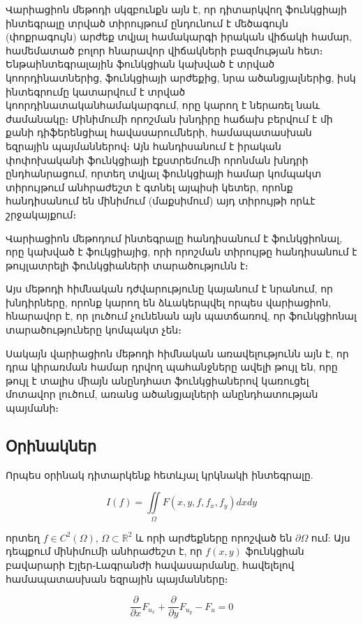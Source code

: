 \documentclass[fleqn, bachelor,subf,12pt,notitlepage]{disser}
\begin{document}
Վարիացիոն մեթոդի սկզբունքն այն է, որ դիտարկվող ֆունկցիայի ինտեգրալը տրված տիրույթում ընդունում է մեծագույն (փոքրագույն) արժեք տվյալ համակարգի իրական վիճակի համար, համեմատած բոլոր հնարավոր վիճակների բազմության հետ։ \newline Ենթաինտեգրալային ֆունկցիան կախված է տրված կոորդինատներից, ֆունկցիայի արժեքից, նրա ածանցյալներից, իսկ ինտեգրումը կատարվում է տրված կոորդինատական\newline համակարգում, որը կարող է ներառել նաև ժամանակը։ Մինիմումի որոշման խնդիրը հաճախ բերվում է մի քանի դիֆերենցիալ հավասարումների, համապատասխան եզրային պայմաններով։ \newline Այն հանդիսանում է իրական փոփոխականի ֆունկցիայի էքստրեմումի որոնման խնդրի ընդհանրացում, որտեղ տվյալ ֆունկցիայի համար կոմպակտ տիրույթում անհրաժեշտ է գտնել այպիսի կետեր, որոնք հանդիսանում են մինիմում (մաքսիմում) այդ տիրույթի որևէ շրջակայքում։

Վարիացիոն մեթոդում ինտեգրալը հանդիսանում է ֆունկցիոնալ, որը կախված է ֆուկցիայից, որի որոշման տիրույթը հանդիսանում է թույլատրելի ֆունկցիաների \newline տարածությունն է։ 

Այս  մեթոդի հիմնական դժվարությունը կայանում է նրանում, որ խնդիրները, որոնք կարող են ձևակերպվել որպես վարիացիոն, հնարավոր է, որ լուծում չունենան այն պատճառով, որ ֆունկցիոնալ տարածություները  կոմպակտ չեն։

Սակայն վարիացիոն մեթոդի հիմնական առավելությունն այն է, որ դրա կիրառման համար դրվող պահանջները ավելի թույլ են, որը թույլ է տալիս միայն անընդհատ \newpage ֆունկցիաներով կառուցել մոտավոր լուծում, առանց ածանցյալների անընդհատության պայմանի։

\newpage
\subsection*{Օրինակներ}

Որպես օրինակ դիտարկենք հետևյալ կրկնակի ինտեգրալը.

$$I\left(f\right)=\iint \limits_{\Omega} F\left(x, y, f, f_{x}, f_{y}\right)dxdy$$

\noindent որտեղ $f \in C^{2}(\Omega)$,  $\Omega\subset \mathbb{R}^{2}$ և որի արժեքները որոշված են $\partial \Omega$ ում:
\noindent Այս դեպքում մինիմումի անհրաժեշտ է, որ $f(x,y)$ ֆունկցիան բավարարի Էյլեր֊Լագրանժի հավասարմանը, հավելելով համապատասխան եզրային պայմանները։

$$\dfrac{\partial}{\partial x}F_{u_{x}} + \dfrac{\partial}{\partial y}F_{u_{y}} - F_{u} = 0$$
\end{document}
